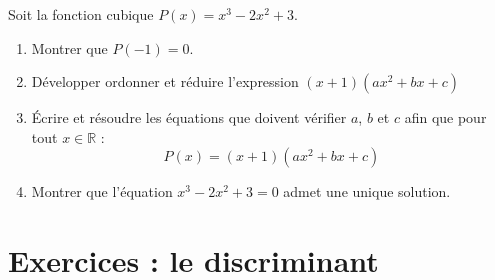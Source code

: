 \documentclass[main.tex]{subfiles}
\begin{document}
\begin{exercise} Soit la fonction cubique $P(x)=x^3-2x^2+3$. 
	\begin{enumerate}[label=\arabic*), leftmargin=*]
		\item Montrer que $P(-1)=0$.
		\item Développer ordonner et réduire l'expression $(x+1)(ax^2+bx+c)$
		\item Écrire et résoudre les équations que doivent vérifier $a$, $b$ et $c$ afin que pour tout
		$x\in\mathbb{R}$ : 
		\setlength{\abovedisplayskip}{3pt}
		\setlength{\belowdisplayskip}{3pt}
		$$
		P(x)= (x+1)(ax^2+bx+c)
		$$ 
		\item Montrer que l'équation $x^3-2x^2+3=0$ admet une unique solution.
	\end{enumerate} 
\end{exercise}
\newpage
\section{Exercices : le discriminant}
\end{document}
